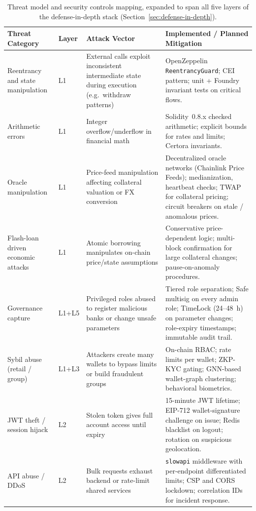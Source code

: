\documentclass[12pt,a4paper]{report}
\begin{document}
\begin{table}[H]
\centering
\caption{Threat model and security controls mapping, expanded to span all five layers of the defense-in-depth stack (Section~\ref{sec:defense-in-depth}).}
\label{tab:threat-model}
\begin{tabular}{p{2.6cm}p{2.0cm}p{4.5cm}p{4.8cm}}
\hline
\textbf{Threat Category} & \textbf{Layer} & \textbf{Attack Vector} & \textbf{Implemented / Planned Mitigation} \\
\hline
Reentrancy and state manipulation & L1 & External calls exploit inconsistent intermediate state during execution (e.g.\ withdraw patterns) & OpenZeppelin \texttt{ReentrancyGuard}; CEI pattern; unit + Foundry invariant tests on critical flows. \\
\hline
Arithmetic errors & L1 & Integer overflow/underflow in financial math & Solidity~0.8.x checked arithmetic; explicit bounds for rates and limits; Certora invariants. \\
\hline
Oracle manipulation & L1 & Price-feed manipulation affecting collateral valuation or FX conversion & Decentralized oracle networks (Chainlink Price Feeds); medianization, heartbeat checks; TWAP for collateral pricing; circuit breakers on stale / anomalous prices. \\
\hline
Flash-loan driven economic attacks & L1 & Atomic borrowing manipulates on-chain price/state assumptions & Conservative price-dependent logic; multi-block confirmation for large collateral changes; pause-on-anomaly procedures. \\
\hline
Governance capture & L1+L5 & Privileged roles abused to register malicious banks or change unsafe parameters & Tiered role separation; Safe multisig on every admin role; TimeLock (24--48~h) on parameter changes; role-expiry timestamps; immutable audit trail. \\
\hline
Sybil abuse (retail / group) & L1+L3 & Attackers create many wallets to bypass limits or build fraudulent groups & On-chain RBAC; rate limits per wallet; ZKP-KYC gating; GNN-based wallet-graph clustering; behavioral biometrics. \\
\hline
JWT theft / session hijack & L2 & Stolen token gives full account access until expiry & 15-minute JWT lifetime; EIP-712 wallet-signature challenge on issue; Redis blacklist on logout; rotation on suspicious geolocation. \\
\hline
API abuse / DDoS & L2 & Bulk requests exhaust backend or rate-limit shared services & \texttt{slowapi} middleware with per-endpoint differentiated limits; CSP and CORS lockdown; correlation IDs for incident response. \\

\end{tabular}
\end{table}
\end{document}
